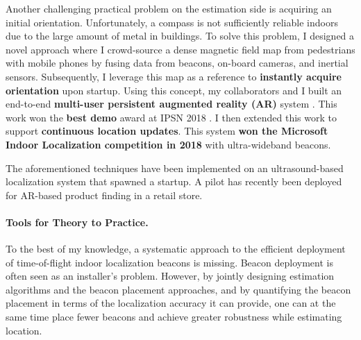 \documentclass[10pt]{article}
\begin{document}
Another challenging practical problem on the estimation side is acquiring an initial orientation. Unfortunately, a compass is not sufficiently reliable indoors due to the large amount of metal in buildings. 
To solve this problem, I designed a novel approach where I crowd-source a dense magnetic field map from pedestrians with mobile phones by fusing data from beacons, on-board cameras, and inertial sensors. Subsequently, I leverage this map as a reference to \textbf{instantly acquire orientation} upon startup. 
Using this concept, my collaborators and I built an end-to-end \textbf{multi-user persistent augmented reality (AR)} system \cite{mobileAR}. This work won the \textbf{best demo} award at IPSN 2018 \cite{rajagopal2018welcome}. I then extended this work to support \textbf{continuous location updates}. This system \textbf{won the Microsoft Indoor Localization competition in 2018} with ultra-wideband beacons.  

The aforementioned techniques have been implemented on an ultrasound-based localization system that spawned a startup. A pilot has recently been deployed for AR-based product finding in a retail store. 




\paragraph{Tools for Theory to Practice.  }
To the best of my knowledge, a systematic approach to the efficient deployment of time-of-flight indoor localization beacons is missing. 
Beacon deployment is often seen as an installer's problem. 
However, by jointly designing estimation algorithms and the beacon placement approaches, and by quantifying the beacon placement in terms of the localization accuracy it can provide, one can at the same time place fewer beacons and achieve greater robustness while estimating location.
\end{document}
